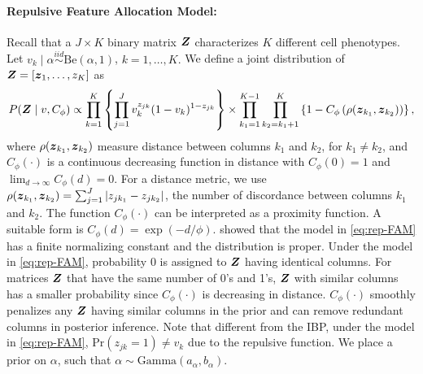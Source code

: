 \documentclass[12pt,]{article}
\newcommand{\p}[1]{\left(#1\right)}
\newcommand{\bc}[1]{ \left\{#1\right\} }
\newcommand{\abs}[1]{ \left|#1\right| }
\newcommand{\iid}{\overset{iid}{\sim}}
\def\Be{\text{Be}}
\def\Prob{\text{Pr}}
\newcommand{\bZ}{\mbox{\boldmath $Z$}}
\newcommand{\bz}{\mbox{\boldmath $z$}}
\begin{document}
\paragraph*{Repulsive Feature Allocation Model:} Recall that a $J\times K$ binary
matrix $\bZ$ characterizes $K$ different cell phenotypes.  Let $v_k \mid \alpha
\iid \Be(\alpha, 1)$, $k=1, \ldots, K.$ We define a joint distribution of
$\bZ=[\bz_1, \ldots, z_K]$ as
\begin{eqnarray}
P(\bZ \mid v, C_\phi) \propto \prod_{k=1}^K  \bc{\prod_{j=1}^J
v_k^{z_{jk}}(1-v_k)^{1-z_{jk}}} \times
\prod_{k_1=1}^{K-1}\prod_{k_2=k_1+1}^{K} \left\{1 - C_\phi\p{\rho(\bz_{k_1},
\bz_{k_2})}\right\},  \label{eq:rep-FAM}
\end{eqnarray}
where $\rho(\bz_{k_1}, \bz_{k_2})$ measure distance between columns $k_1$ and
$k_2$, for $k_1 \neq k_2$, and $C_\phi(\cdot)$ is a continuous decreasing
function in distance with $C_\phi(0)=1$ and
$\lim_{d\rightarrow\infty}C_\phi(d)= 0$. For a distance metric, we use
$\rho(\bz_{k_1}, \bz_{k_2})=\sum_{j=1}^J \abs{z_{jk_1} - z_{jk_2}}$, the number
of discordance between columns $k_1$ and $k_2$.  The function $C_\phi(\cdot)$
can be interpreted as a proximity function. A suitable form is $C_\phi(d) =
\exp\p{-d/\phi}$. \cite{quinlan2017parsimonious} showed that the model in
\eqref{eq:rep-FAM} has a finite normalizing constant and the distribution is
proper.  Under the model in \eqref{eq:rep-FAM}, probability 0 is assigned to
$\bZ$ having identical columns.  For matrices $\bZ$ that have the same number
of 0's and 1's, $\bZ$ with similar columns has a smaller probability since
$C_\phi(\cdot)$ is decreasing in distance. $C_\phi(\cdot)$ smoothly penalizes
any $\bZ$ having similar columns in the prior and can remove redundant columns in
posterior inference. Note that different from the IBP, under the model in
\eqref{eq:rep-FAM}, $\Prob(z_{jk}=1) \neq v_k$ due to the repulsive function.
We place a prior on $\alpha$, such that $\alpha \sim \text{Gamma}(a_\alpha,
b_\alpha)$.
\end{document}
